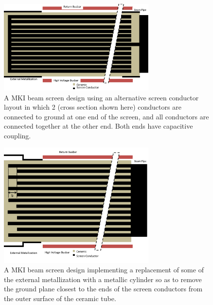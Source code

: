 \begin{figure}
\begin{center}
\includegraphics[width=0.7\textwidth]{LHC_MKI/figures/mki-design-layouts/alternative_screen_design.pdf}
\end{center}
\caption{A MKI beam screen design using an alternative screen conductor layout in which 2 (cross section shown here) conductors are connected to ground at one end of the screen, and all conductors are connected together at the other end. Both ends have capacitive coupling.}
\label{fig:alt-screen-design}
\end{figure}

\begin{figure}
\begin{center}
\includegraphics[width=0.7\textwidth]{LHC_MKI/figures/mki-design-layouts/alternating_screen_conductors_step_out_metallisation.pdf}
\end{center}
\caption{A MKI beam screen design implementing a replacement of some of the external metallization with a metallic cylinder so as to remove the ground plane closest to the ends of the screen conductors from the outer surface of the ceramic tube.}
\label{fig:24-step-out-slight}
\end{figure}

